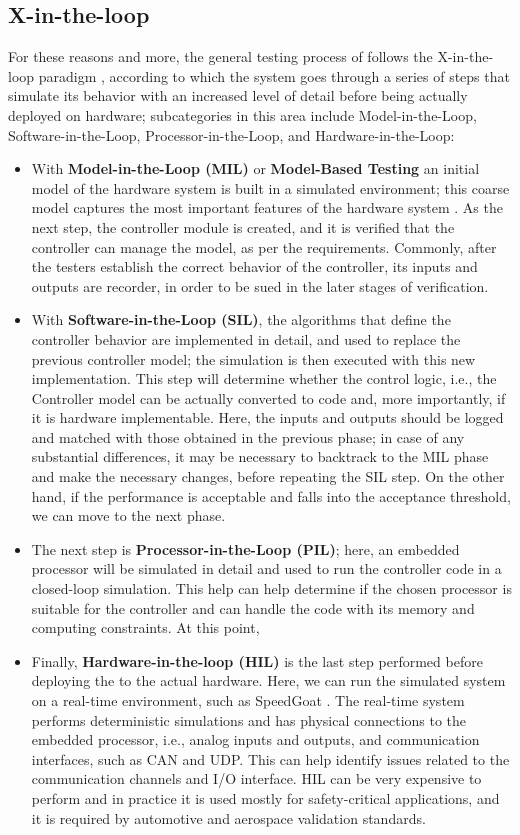 \subsection{X-in-the-loop}
For these reasons and more, the general testing process of \ess follows the X-in-the-loop paradigm \cite{DBLP:journals/software/GarousiFKY18}, according to which the system goes through a series of steps that simulate its behavior with an increased level of detail before being actually deployed on hardware; subcategories in this area include Model-in-the-Loop, Software-in-the-Loop, Processor-in-the-Loop, and Hardware-in-the-Loop:
\begin{itemize}
    \item With \textbf{Model-in-the-Loop (MIL)} or \textbf{Model-Based Testing} an initial model of the hardware system is built in a simulated environment; this coarse model captures the most important features of the hardware system \cite{XLoop}. As the next step, the controller module is created, and it is verified that the controller can manage the model, as per the requirements. Commonly, after the testers establish the correct behavior of the controller, its inputs and outputs are recorder, in order to be sued in the later stages of verification.
    \item With \textbf{Software-in-the-Loop (SIL)}, the algorithms that define the controller behavior are implemented in detail, and used to replace the previous controller model; the simulation is then executed with this new implementation. This step will determine whether the control logic, i.e., the Controller model can be actually converted to code and, more importantly, if it is hardware implementable. Here, the inputs and outputs should be logged and matched with those obtained in the previous phase; in case of any substantial differences, it may be necessary to backtrack to the MIL phase and make the necessary changes, before repeating the SIL step. On the other hand, if the performance is acceptable and falls into the acceptance threshold, we can move to the next phase.
    \item The next step is \textbf{Processor-in-the-Loop (PIL)}; here, an embedded processor will be simulated in detail and used to run the controller code in a closed-loop simulation. This help can help determine if the chosen processor is suitable for the controller and can handle the code with its memory and computing constraints. At this point, 
    \item Finally, \textbf{Hardware-in-the-loop (HIL)} is the last step performed before deploying the \es to the actual hardware. Here, we can run the simulated system on a real-time environment, such as SpeedGoat \cite{SpeedGoat}. The real-time system performs deterministic simulations and has physical connections to the embedded processor, i.e., analog inputs and outputs, and communication interfaces, such as CAN and UDP. This can help identify issues related to the communication channels and I/O interface. HIL can be very expensive to perform and in practice it is used mostly for safety-critical applications, and it is required by automotive and aerospace validation standards. 
\end{itemize}

